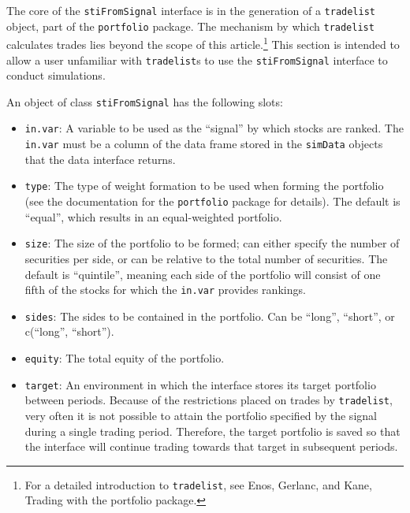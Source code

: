 \documentclass{article}
\begin{document}
The core of the \texttt{stiFromSignal} interface is in the generation
of a \texttt{tradelist} object, part of the \texttt{portfolio}
package.  The mechanism by which \texttt{tradelist} calculates trades
lies beyond the scope of this article.\footnote{For a detailed
introduction to \texttt{tradelist}, see Enos, Gerlanc, and Kane,
Trading with the portfolio package.}  This section is intended to
allow a user unfamiliar with \texttt{tradelist}s to use the
\texttt{stiFromSignal} interface to conduct simulations.

An object of class \texttt{stiFromSignal} has the following slots:

\begin{itemize}

\item{\texttt{in.var}}: A variable to be used as the ``signal'' by
which stocks are ranked.  The \texttt{in.var} must be a column of the
data frame stored in the \texttt{simData} objects that the data
interface returns.

\item{\texttt{type}}: The type of weight formation to be used when
forming the portfolio (see the documentation for the
\texttt{portfolio} package for details).  The default is ``equal'',
which results in an equal-weighted portfolio.

\item{\texttt{size}}: The size of the portfolio to be formed; can
either specify the number of securities per side, or can be relative
to the total number of securities.  The default is ``quintile'',
meaning each side of the portfolio will consist of one fifth of the
stocks for which the \texttt{in.var} provides rankings.

\item{\texttt{sides}}: The sides to be contained in the portfolio.
Can be ``long'', ``short'', or c(``long'', ``short'').

\item{\texttt{equity}}: The total equity of the portfolio.

\item{\texttt{target}}: An environment in which the interface stores
its target portfolio between periods.  Because of the restrictions
placed on trades by \texttt{tradelist}, very often it is not possible
to attain the portfolio specified by the signal during a single
trading period.  Therefore, the target portfolio is saved so that the
interface will continue trading towards that target in subsequent
periods.


\end{itemize}
\end{document}
